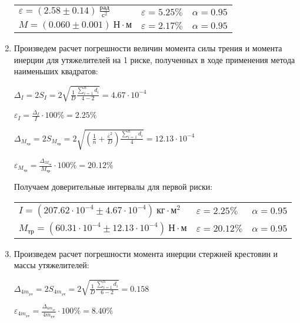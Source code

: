 \begin{enumerate}
\begin{tabular}{lll}
        $\varepsilon = (2.58 \pm 0.14) \ \frac{\text{рад}}{\text{с}^2}$ & $\varepsilon = 5.25\%$ & $\alpha = 0.95$ \\

        $M = (0.060 \pm 0.001) \ \text{Н} \cdot \text{м}$ & $\varepsilon = 2.17\%$ & $\alpha = 0.95$ \\
    \end{tabular}

    \smallvspace

    \item Произведем расчет погрешности величин момента силы трения и момента инерции для утяжелителей на 1 риске, 
    полученных в ходе применения метода наименьших квадратов:

    $\displaystyle \Delta_I = 2 S_I = 2\sqrt{\frac{1}{D} \frac{\sum_{i = 1}^n d_i}{4 - 2}} = 4.67 \cdot 10^{-4}$

    $\displaystyle \varepsilon_I = \frac{\Delta_I}{I} \cdot 100\% = 2.25\%$

    $\displaystyle \Delta_{M_\text{тр}} = 2S_{M_\text{тр}} = 2\sqrt{\left(\frac{1}{n} + \frac{\overline{\varepsilon}^2}{D}\right) \frac{\sum_{i = 1}^n d_i}{4}} = 12.13 \cdot 10^{-4}$

    $\displaystyle \varepsilon_{M_\text{тр}} = \frac{\Delta_{M_\text{тр}}}{{M_\text{тр}}} \cdot 100\% = 20.12\%$

    Получаем доверительные интервалы для первой риски:

    \begin{tabular}{lll}
        $I = (207.62 \cdot 10^{-4} \pm 4.67 \cdot 10^{-4}) \ \text{кг} \cdot \text{м}^2$ & $\varepsilon = 2.25\%$ & $\alpha = 0.95$ \\

        $M_\text{тр} = (60.31 \cdot 10^{-4} \pm 12.13 \cdot 10^{-4}) \ \text{Н} \cdot \text{м}$ & $\varepsilon = 20.12\%$ & $\alpha = 0.95$ \\
    \end{tabular}

    \smallvspace

    \item Произведем расчет погрешности момента инерции стержней крестовин и массы утяжелителей:

    $\displaystyle \Delta_{4m_\text{ут}} = 2 S_{4m_\text{ут}} = 2\sqrt{\frac{1}{D} \frac{\sum_{i = 1}^n d_i}{6 - 2}} = 0.158$

    $\displaystyle \varepsilon_{4m_\text{ут}} = \frac{\Delta_{4m_\text{ут}}}{4m_\text{ут}} \cdot 100\% = 8.40\%$


\end{enumerate}
